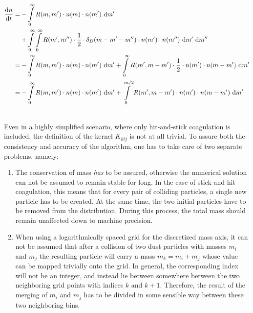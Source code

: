     \begin{align}
        \deriv{n}{t} 
        =
        &-\int\limits_0^\infty R(m,m') \cdot n(m) \cdot n(m') \ \text dm' \\
        &+\int\limits_0^\infty \int\limits_0^\infty R(m',m'') \cdot 
            \frac{1}{2} \cdot \delta_D(m-m'-m'')
            \cdot n(m') \cdot n(m'') \ \text dm' \ \text dm'' \\
        =
        &-\int\limits_0^\infty R(m,m') \cdot n(m) \cdot n(m') \ \text dm'
        +\int\limits_0^\infty R(m',m-m') \cdot \frac{1}{2} \cdot n(m') \cdot n(m-m') \ \text dm' \\
        =
        &-\int\limits_0^\infty R(m,m') \cdot n(m) \cdot n(m') \ \text dm'
        +\int\limits_0^{m/2} R(m',m-m') \cdot n(m') \cdot n(m-m') \ \text dm'
    \end{align}


     \\

    Even in a highly simplified scenario, where only hit-and-stick coagulation is included, the 
    definition of the kernel $K_{kij}$ is not at all trivial. To assure both the consistency and 
    accuracy of the algorithm, one has to take care of two separate problems, namely:
    \begin{enumerate}
        \item The conservation of mass \textit{has} to be assured, otherwise the numerical solution can 
            not be assumed to remain stable for long. In the case of stick-and-hit coagulation, this 
            means that for every pair of colliding particles, a single new particle has to be created. 
            At the same time, the two initial particles have to be removed from the distribution. 
            During this process, the total mass should remain unaffected down to machine precision.
        \item When using a logarithmically spaced grid for the discretized mass axis, it can not be 
            assumed that after a collision of two dust particles with masses $m_i$ and $m_j$ the 
            resulting particle will carry a mass $m_k=m_i+m_j$ whose value can be mapped trivially onto 
            the grid. In general, the corresponding index will not be an integer, and instead lie 
            between somewhere between the two neighboring grid points with indices $k$ and $k+1$.
            Therefore, the result of the merging of $m_i$ and $m_j$ has to be divided in some sensible 
            way between these two neighboring bins.
    \end{enumerate}

